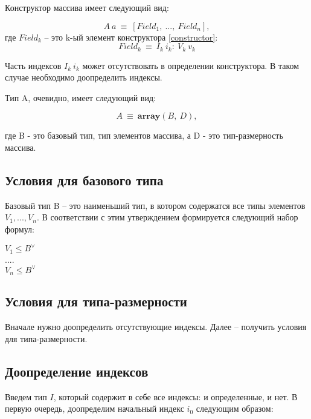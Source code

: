 \documentclass[10pt,a4paper]{article}
\begin{document}
Конструктор массива имеет следующий вид:

\begin{equation}\label{constructor}
A~a~\equiv~[Field_1,~...,~Field_n],
\end{equation}
где $ Field_k $ -- это k-ый элемент конструктора \eqref{constructor}:
\begin{equation}\label{field}
Field_k~\equiv~I_k~i_k:~V_k~v_k
\end{equation}

Часть индексов $ I_k~i_k $ может отсутствовать в определении конструктора. В таком случае необходимо доопределить индексы.

Тип A, очевидно, имеет следующий вид:

\begin{equation}
A~\equiv~\textbf{array}(B,~D),
\end{equation}

где B - это базовый тип, тип элементов массива, а D - это тип-размерность массива.

\subsection{Условия для базового типа}

Базовый тип B -- это наименьший тип, в котором содержатся все типы элементов $ V_1, ..., V_n $.
В соответствии с этим утверждением формируется следующий набор формул:

\begin{center}
$ V_1 \leq B^{\vee} $
\\
....
\\
$ V_n \leq B^{\vee} $
\end{center}

\subsection{Условия для типа-размерности}

Вначале нужно доопределить отсутствующие индексы. Далее -- получить условия для типа-размерности.

\subsection{Доопределение индексов}

Введем тип $ I $, который содержит в себе все индексы: и определенные, и нет. В первую очередь, доопределим
начальный индекс $ i_0 $ следующим образом:
\end{document}
